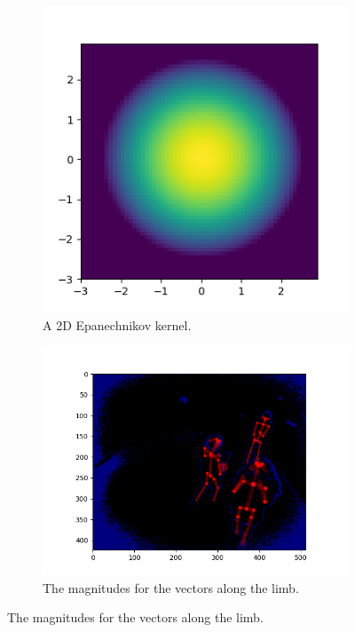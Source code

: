\begin{figure}
  \begin{subfigure}{.4\textwidth}
    \centering
    \includegraphics[width=\linewidth]{img/epanechnikov_2d}
    \caption{A 2D Epanechnikov \cite{epanechnikov_1969} kernel.}
    \label{fig:epanechnikov}
  \end{subfigure}%
  \begin{subfigure}{.6\textwidth}
    \centering
    \includegraphics[width=\linewidth]{img/magnitudes}
    \caption{The magnitudes for the vectors along the limb.}
    \label{fig:magnitude}
  \end{subfigure}
\end{figure}

